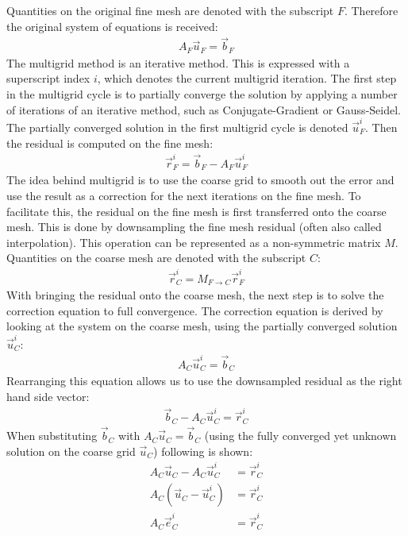 Quantities on the original fine mesh are denoted with the subscript $F$. Therefore the original system of equations is received:
\begin{align}
\nonumber
A_F\vec{u}_F = \vec{b}_F
\end{align}
The multigrid method is an iterative method. This is expressed with a superscript index $i$, which denotes the current multigrid iteration. The first step in the multigrid cycle is to partially converge the solution by applying a number of iterations of an iterative method, such as Conjugate-Gradient or Gauss-Seidel. The partially converged solution in the first multigrid cycle is denoted $\vec{u}_F^i$. Then the residual is computed on the fine mesh:
\begin{align}
\nonumber
\vec{r}_F^i = \vec{b}_F-A_F\vec{u}_F^i
\end{align}
The idea behind multigrid is to use the coarse grid to smooth out the error and use the result as a correction for the next iterations on the fine mesh. To facilitate this, the residual on the fine mesh is first transferred onto the coarse mesh. This is done by downsampling the fine mesh residual (often also called interpolation). This operation can be represented as a non-symmetric matrix $M$. Quantities on the coarse mesh are denoted with the subscript $C$:
\begin{align}
\nonumber
\vec{r}_C^i = M_{F\rightarrow C} \vec{r}_F^i
\end{align}
With bringing the residual onto the coarse mesh, the next step is to solve the correction equation to full convergence. The correction equation is derived by looking at the system on the coarse mesh, using the partially converged solution $\vec{u}_C^i$:
\begin{align}
\nonumber
A_C\vec{u}_C^i = \vec{b}_C
\end{align}
Rearranging this equation allows us to use the downsampled residual as the right hand side vector:
\begin{align}
\nonumber
\vec{b}_C - A_C\vec{u}_C^i = \vec{r}_C^i
\end{align}
When substituting $\vec{b}_C$ with $A_C\vec{u}_C=\vec{b}_C$ (using the fully converged yet unknown solution on the coarse grid $\vec{u}_C$) following is shown:
\begin{align}
A_C\vec{u}_C - A_C\vec{u}_C^i &= \vec{r}_C^i
\nonumber
\\
A_C\left(\vec{u}_C-\vec{u}_C^i\right) &= \vec{r}_C^i
\nonumber
\\
A_C\vec{e}_C^i &= \vec{r}_C^i
\label{eq:da_correction_equation}
\end{align}
